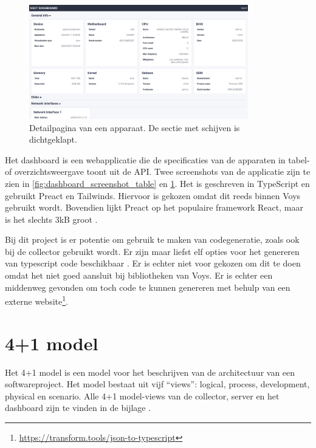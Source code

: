 \documentclass[../report.tex]{subfiles}
\begin{document}
\begin{figure}[ht]
  \centering
  \includegraphics[width=0.85\textwidth]{assets/images/infra-ssot-dashboard-details.png}
  \caption{Detailpagina van een apparaat. De sectie met schijven is dichtgeklapt.}
  \label{fig:dashboard_screenshot_details}
\end{figure}

Het dashboard is een webapplicatie die de specificaties van de apparaten in tabel- of overzichtsweergave toont uit de \gls*{API}. Twee screenshots van de applicatie zijn te zien in \autoref{fig:dashboard_screenshot_table} en \ref{fig:dashboard_screenshot_details}. Het is geschreven in TypeScript en gebruikt \gls*{Preact} en \gls*{Tailwinds}. Hiervoor is gekozen omdat dit reeds binnen Voys gebruikt wordt. Bovendien lijkt \gls*{Preact} op het populaire framework React, maar is het slechts 3kB groot \parencite{preact}.

Bij dit project is er potentie om gebruik te maken van codegeneratie, zoals ook bij de collector gebruikt wordt. Er zijn maar liefst elf opties voor het genereren van typescript code beschikbaar \parencite{openapi_generator}. Er is echter niet voor gekozen om dit te doen omdat het niet goed aansluit bij bibliotheken van Voys. Er is echter een middenweg gevonden om toch code te kunnen genereren met behulp van een externe website\footnote{\url{https://transform.tools/json-to-typescript}}.

\section{4+1 model}

Het 4+1 model is een model voor het beschrijven van de architectuur van een softwareproject. Het model bestaat uit vijf ``views'': logical, process, development, physical en scenario. Alle 4+1 model-views van de collector, server en het dashboard zijn te vinden in de bijlage \parencite{four_plus_one_model}.


\end{document}
